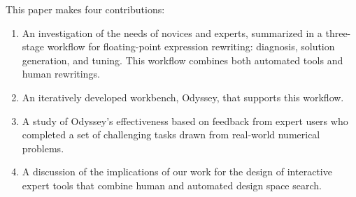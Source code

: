 This paper makes four contributions:
\begin{enumerate}
  \item An investigation of the needs of novices and experts,
    summarized in a three-stage workflow
    for floating-point expression rewriting:
    diagnosis, solution generation, and tuning.
    This workflow combines both automated tools and human rewritings.
  \item An iteratively developed workbench, Odyssey, 
    that supports this workflow.
  \item A study of Odyssey's effectiveness based on feedback from expert users
    who completed a set of challenging tasks
    drawn from real-world numerical problems.
  \item A discussion of the implications of our work
    for the design of interactive expert tools
    that combine human and automated design space search.
\end{enumerate}
